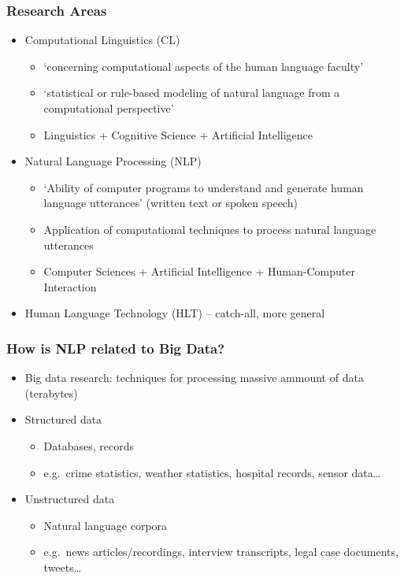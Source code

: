 \begin{frame}
\frametitle{Research Areas}

\begin{itemize}
\item<1> Computational Linguistics (CL)
\begin{itemize}
\item `concerning computational aspects of the human language faculty'
\item `statistical or rule-based modeling of natural language from a computational perspective'
\item Linguistics + Cognitive Science + Artificial Intelligence
\end{itemize}

\item<2> Natural Language Processing (NLP)
\begin{itemize}
\item `Ability of computer programs to understand and generate human language utterances' (written text or spoken speech)
\item Application of computational techniques to process natural language utterances
\item Computer Sciences + Artificial Intelligence + Human-Computer Interaction
\end{itemize}

\item<3> Human Language Technology (HLT) -- catch-all, more general

\end{itemize}
\end{frame}


\begin{frame}
\frametitle{How is NLP related to Big Data?}
    
\begin{itemize}
\item Big data research: techniques for processing massive ammount of data (terabytes)
\item Structured data
	\begin{itemize}
	\item Databases, records
	\item e.g.~crime statistics, weather statistics, hospital records, sensor data\ldots
	\end{itemize}
\item Unstructured data
	\begin{itemize}
	\item \alert{Natural language corpora}
	\item e.g.~news articles/recordings, interview transcripts, legal case documents, tweets\ldots
	\end{itemize}
\end{itemize}

\end{frame}
